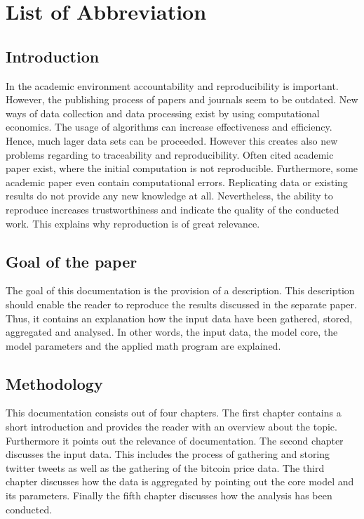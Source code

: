 \documentclass[a4paper,12pt]{article}
\begin{document}
    \clearpage
    \tableofcontents
    
    \clearpage
    
    \listoffigures 	
    \section*{List of Abbreviation} 
	\begin{acronym}[ASECRETTT] 
	\end{acronym}
    \clearpage
    



\begin{spacing}{1.2}
\cleardoublepage{}
\section{Introduction}
In the academic environment accountability and reproducibility is important. However, the publishing process of papers and journals seem to be outdated. New ways of data collection and data processing exist by using computational economics. The usage of algorithms can increase effectiveness and efficiency. Hence, much lager data sets can be proceeded. However this creates also new problems regarding to traceability and reproducibility. Often cited academic paper exist, where the initial computation is not reproducible. Furthermore, some academic paper even contain computational errors. Replicating data or existing results do not provide any new knowledge at all. Nevertheless, the ability to reproduce increases trustworthiness and indicate the quality of the conducted work. This explains why reproduction is of great relevance.

\subsection{Goal of the paper}
The goal of this documentation is the provision of a description. This description should enable the reader to reproduce the results discussed in the separate paper. Thus, it contains an explanation how the input data have been gathered, stored, aggregated and analysed. In other words, the input data, the model core, the model parameters and the applied math program are explained.

\subsection{Methodology}
This documentation consists out of four chapters. The first chapter contains a short introduction and provides the reader with an overview about the topic. Furthermore it points out the relevance of documentation. The second chapter discusses the input data. This includes the process of gathering and storing twitter tweets as well as the gathering of the bitcoin price data. The third chapter discusses how the data is aggregated by pointing out the core model and its parameters. Finally the fifth chapter discusses how the analysis has been conducted.


\end{spacing}
\end{document}

